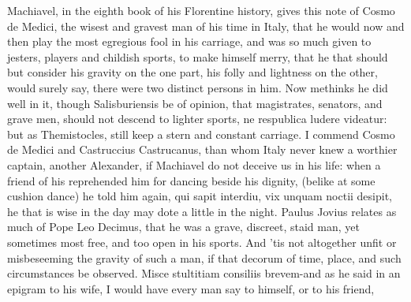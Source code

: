 {Machiavel, in the eighth book of his Florentine history, gives this
note of Cosmo de Medici, the wisest and gravest man of his time in
Italy, that he would now and then play the most egregious fool in
his carriage, and was so much given to jesters, players and childish
sports, to make himself merry, that he that should but consider his
gravity on the one part, his folly and lightness on the other, would
surely say, there were two distinct persons in him. Now methinks he did
well in it, though  Salisburiensis be of opinion, that
magistrates, senators, and grave men, should not descend to lighter
sports, ne respublica ludere videatur: but as Themistocles, still keep
a stern and constant carriage. I commend Cosmo de Medici and
Castruccius Castrucanus, than whom Italy never knew a worthier captain,
another Alexander, if Machiavel do not deceive us in his life:
when a friend of his reprehended him for dancing beside his dignity,
(belike at some cushion dance) he told him again, qui sapit interdiu,
vix unquam noctii desipit, he that is wise in the day may dote a little
in the night. Paulus Jovius relates as much of Pope Leo Decimus, that
he was a grave, discreet, staid man, yet sometimes most free, and too
open in his sports. And 'tis not altogether unfit or misbeseeming
the gravity of such a man, if that decorum of time, place, and such
circumstances be observed. Misce stultitiam consiliis brevem-and
as he said in an epigram to his wife, I would have every man say
to himself, or to his friend,

}
